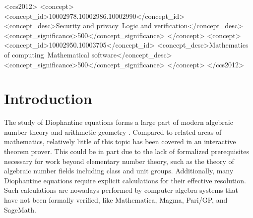\documentclass[sigplan,10pt,nonacm,
screen]{acmart} \settopmatter{printfolios=true,printccs=false,printacmref=false}
\newcommand{\ab}[1]{\todo[color=green]{AB: #1}}
\begin{document}
\begin{CCSXML}
<ccs2012>
<concept>
<concept_id>10002978.10002986.10002990</concept_id>
<concept_desc>Security and privacy~Logic and verification</concept_desc>
<concept_significance>500</concept_significance>
</concept>
<concept>
<concept_id>10002950.10003705</concept_id>
<concept_desc>Mathematics of computing~Mathematical software</concept_desc>
<concept_significance>500</concept_significance>
</concept>
</ccs2012>
\end{CCSXML}



\maketitle

\section{Introduction}\label{sec:Intro}%

The study of Diophantine equations forms a large part of modern algebraic number theory and arithmetic geometry \cite{cohen2007number}.
Compared to related areas of mathematics, relatively little of this topic has been covered in an interactive theorem prover.
This could be in part due to the lack of formalized prerequisites
necessary for work beyond elementary number theory,
such as the theory of algebraic number fields including class and unit groups.
Additionally, many Diophantine equations require explicit calculations for their effective resolution.
Such calculations are nowadays performed by computer algebra systems that have not been formally verified, like Mathematica, Magma, Pari/GP, and SageMath.
\end{document}
